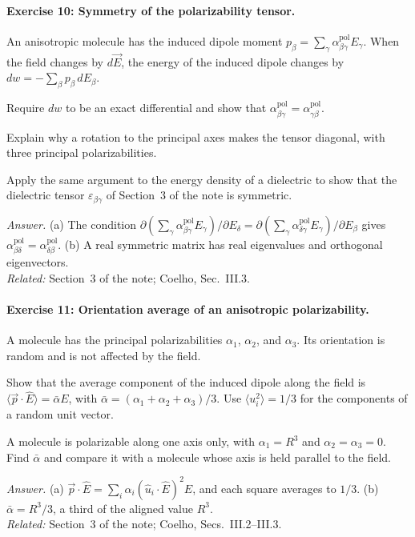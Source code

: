 \documentclass[11pt]{article}      %
\numberwithin{equation}{section}   %
\begin{document}
\paragraph{Exercise 10: Symmetry of the polarizability tensor.}
An anisotropic molecule has the induced dipole moment $p_\beta = \sum_\gamma \alpha^{\text{pol}}_{\beta\gamma}E_\gamma$. When the field changes by $d\vec E$, the energy of the induced dipole changes by $dw = -\sum_\beta p_\beta\,dE_\beta$.
\begin{parts}
    \item Require $dw$ to be an exact differential and show that $\alpha^{\text{pol}}_{\beta\gamma} = \alpha^{\text{pol}}_{\gamma\beta}$.
    \item Explain why a rotation to the principal axes makes the tensor diagonal, with three principal polarizabilities.
    \item Apply the same argument to the energy density of a dielectric to show that the dielectric tensor $\varepsilon_{\beta\gamma}$ of Section~3 of the note is symmetric.
\end{parts}
\textit{Answer.} (a) The condition $\partial(\sum_\gamma\alpha^{\text{pol}}_{\beta\gamma}E_\gamma)/\partial E_\delta = \partial(\sum_\gamma\alpha^{\text{pol}}_{\delta\gamma}E_\gamma)/\partial E_\beta$ gives $\alpha^{\text{pol}}_{\beta\delta} = \alpha^{\text{pol}}_{\delta\beta}$. (b) A real symmetric matrix has real eigenvalues and orthogonal eigenvectors.\\
\textit{Related:} Section~3 of the note; Coelho, Sec.~III.3.

\paragraph{Exercise 11: Orientation average of an anisotropic polarizability.}
A molecule has the principal polarizabilities $\alpha_1$, $\alpha_2$, and $\alpha_3$. Its orientation is random and is not affected by the field.
\begin{parts}
    \item Show that the average component of the induced dipole along the field is $\langle\vec p\cdot\hat E\rangle = \bar\alpha E$, with $\bar\alpha = (\alpha_1 + \alpha_2 + \alpha_3)/3$. Use $\langle u_i^2\rangle = 1/3$ for the components of a random unit vector.
    \item A molecule is polarizable along one axis only, with $\alpha_1 = R^3$ and $\alpha_2 = \alpha_3 = 0$. Find $\bar\alpha$ and compare it with a molecule whose axis is held parallel to the field.
\end{parts}
\textit{Answer.} (a) $\vec p\cdot\hat E = \sum_i\alpha_i(\hat u_i\cdot\hat E)^2E$, and each square averages to $1/3$. (b) $\bar\alpha = R^3/3$, a third of the aligned value $R^3$.\\
\textit{Related:} Section~3 of the note; Coelho, Secs.~III.2--III.3.
\end{document}
